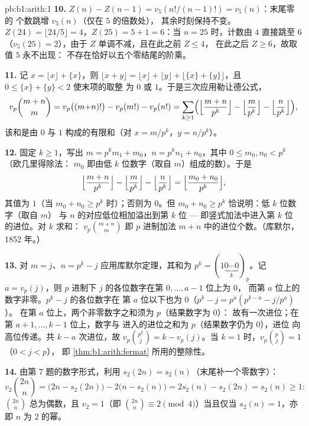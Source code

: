 \begin{solution}{pb:b1:arith:1}
\textbf{10.} $Z(n) - Z(n-1) = v_5(n!/(n-1)!) = v_5(n)$：末尾零的
个数跳增 $v_5(n)$（仅在 $5$ 的倍数处），
其余时刻保持不变。$Z(24) = \lfloor24/5\rfloor = 4$，$Z(25) =
5 + 1 = 6$：当 $n = 25$ 时，计数由 $4$ 直接跳至 $6$
（$v_5(25) = 2$），由于 $Z$ 单调不减，且在此之前 $Z \leq 4$，
在此之后 $Z \geq 6$，故取值 $5$ 永不出现：
不存在恰好以五个零结尾的阶乘。

\textbf{11.} 记 $x = \lfloor x\rfloor + \{x\}$，则 $\lfloor x +
y\rfloor = \lfloor x\rfloor + \lfloor y\rfloor + \lfloor \{x\} +
\{y\}\rfloor$，且 $0 \leq \{x\} + \{y\} < 2$ 使末项的取整
为 $0$ 或 $1$。于是三次应用勒让德公式，
\[
v_p\binom{m+n}m = v_p\bigl((m{+}n)!\bigr) - v_p(m!) - v_p(n!)
= \sum_{k\geq1}\Bigl(
\Bigl\lfloor\frac{m+n}{p^k}\Bigr\rfloor
- \Bigl\lfloor\frac{m}{p^k}\Bigr\rfloor
- \Bigl\lfloor\frac{n}{p^k}\Bigr\rfloor\Bigr),
\]
该和是由 $0$ 与 $1$ 构成的有限和（对 $x =
m/p^k$，$y = n/p^k$）。

\textbf{12.} 固定 $k \geq 1$，写出 $m = p^km_1 + m_0$，$n =
p^kn_1 + n_0$，其中 $0 \leq m_0, n_0 < p^k$（欧几里得除法：
$m_0$ 即由低 $k$ 位数字（取自 $m$）组成的数）。于是
\[
\Bigl\lfloor\frac{m+n}{p^k}\Bigr\rfloor
- \Bigl\lfloor\frac m{p^k}\Bigr\rfloor
- \Bigl\lfloor\frac n{p^k}\Bigr\rfloor
= \Bigl\lfloor\frac{m_0 + n_0}{p^k}\Bigr\rfloor ,
\]
其值为 $1$（当 $m_0 + n_0 \geq p^k$ 时）；否则为 $0$。但 $m_0 +
n_0 \geq p^k$ 恰说明：低 $k$ 位数字（取自 $m$）
与 $n$ 的对应低位相加溢出到第 $k$ 位 --- 即竖式加法中进入第 $k$ 位
的进位。对 $k$ 求和：
$v_p\binom{m+n}m$ 即 $p$ 进制加法
$m + n$ 中的进位个数。（库默尔，1852 年。）

\textbf{13.} 对 $m = j$、$n = p^k - j$ 应用库默尔定理，其和为 $p^k =
(1\underbrace{0\cdots0}_{k})_p$。记 $a = v_p(j)$，则 $p$ 进制下
$j$ 的各位数字在第 $0, \dots, a-1$ 位上为 $0$，
而第 $a$ 位上的数字非零。$p^k - j$ 的各位数字在
第 $a$ 位以下也为 $0$（$p^k - j = p^a(p^{k-a} - j/p^a)$）。
在第 $a$ 位上，两个非零数字之和须为 $p$（结果数字为 $0$）：
故有一次进位；在第 $a+1, \dots, k-1$ 位上，数字与
进入的进位之和为 $p$（结果数字仍为 $0$），进位
向高位传递。共 $k - a$ 次进位，故 $v_p\binom{p^k}j = k -
v_p(j)$。当 $k = 1$ 时，$v_p\binom pj = 1$（$0 < j < p$），
即 \cref{thm:b1:arith:fermat} 所用的整除性。

\textbf{14.} 由第 7 题的数字形式，利用 $s_2(2n) =
s_2(n)$（末尾补一个零数字）：
\[
v_2\binom{2n}n = \bigl(2n - s_2(2n)\bigr) - 2\bigl(n -
s_2(n)\bigr) = 2s_2(n) - s_2(2n) = s_2(n) \geq 1 :
\]
$\binom{2n}n$ 总为偶数，且 $v_2 = 1$（即 $\binom{2n}n
\equiv 2 \pmod 4$）当且仅当 $s_2(n) = 1$，亦即 $n$ 为
$2$ 的幂。


\end{solution}
